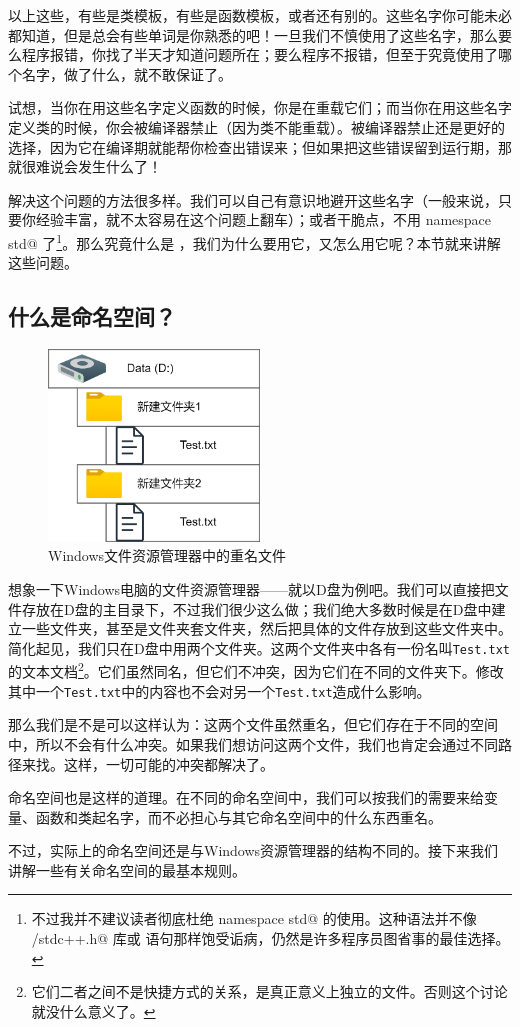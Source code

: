 以上这些，有些是类模板，有些是函数模板，或者还有别的。这些名字你可能未必都知道，但是总会有些单词是你熟悉的吧！一旦我们不慎使用了这些名字，那么要么程序报错，你找了半天才知道问题所在；要么程序不报错，但至于究竟使用了哪个名字，做了什么，就不敢保证了。\par
试想，当你在用这些名字定义函数的时候，你是在重载它们；而当你在用这些名字定义类的时候，你会被编译器禁止（因为类不能重载）。被编译器禁止还是更好的选择，因为它在编译期就能帮你检查出错误来；但如果把这些错误留到运行期，那就很难说会发生什么了！\par
解决这个问题的方法很多样。我们可以自己有意识地避开这些名字（一般来说，只要你经验丰富，就不太容易在这个问题上翻车）；或者干脆点，不用 \lstinline@using namespace std@ 了\footnote{不过我并不建议读者彻底杜绝 \lstinline@using namespace std@ 的使用。这种语法并不像 \lstinline@bits/stdc++.h@ 库或 \lstinline@goto@ 语句那样饱受诟病，仍然是许多程序员图省事的最佳选择。}。那么究竟什么是 \lstinline@namespace@，我们为什么要用它，又怎么用它呢？本节就来讲解这些问题。\par
\subsection*{什么是命名空间？}
\begin{figure}[htbp]
    \centering
    \includegraphics[width=0.5\textwidth]{../images/generalized_parts/07_file_explorer_and_namespaces.drawio.png}
    \caption{Windows文件资源管理器中的重名文件}
\end{figure}
想象一下Windows电脑的文件资源管理器——就以D盘为例吧。我们可以直接把文件存放在D盘的主目录下，不过我们很少这么做；我们绝大多数时候是在D盘中建立一些文件夹，甚至是文件夹套文件夹，然后把具体的文件存放到这些文件夹中。简化起见，我们只在D盘中用两个文件夹。这两个文件夹中各有一份名叫\texttt{Test.txt}的文本文档\footnote{它们二者之间不是快捷方式的关系，是真正意义上独立的文件。否则这个讨论就没什么意义了。}。它们虽然同名，但它们不冲突，因为它们在不同的文件夹下。修改其中一个\texttt{Test.txt}中的内容也不会对另一个\texttt{Test.txt}造成什么影响。\par
那么我们是不是可以这样认为：这两个文件虽然重名，但它们存在于不同的空间中，所以不会有什么冲突。如果我们想访问这两个文件，我们也肯定会通过不同路径来找。这样，一切可能的冲突都解决了。\par
命名空间也是这样的道理。在不同的命名空间中，我们可以按我们的需要来给变量、函数和类起名字，而不必担心与其它命名空间中的什么东西重名。\par
不过，实际上的命名空间还是与Windows资源管理器的结构不同的。接下来我们讲解一些有关命名空间的最基本规则。\par
